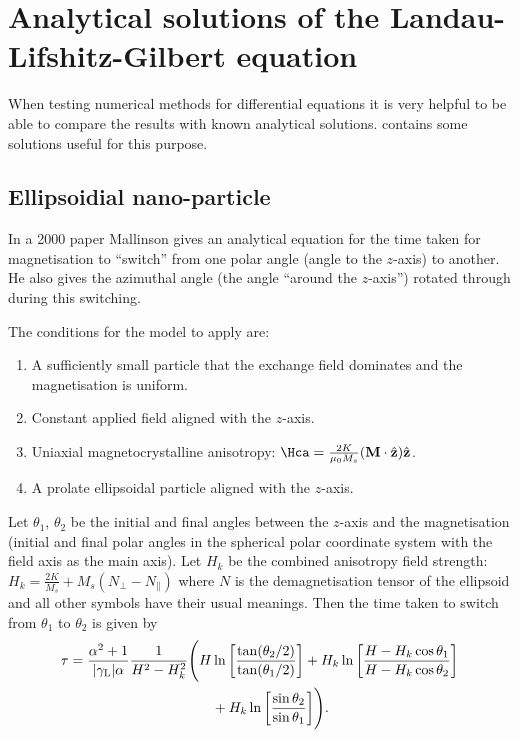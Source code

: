 \chapter{Analytical solutions of the Landau-Lifshitz-Gilbert equation}
\label{cha:analyt-solut-land}

When testing numerical methods for differential equations it is very helpful to be able to compare the results with known analytical solutions.
 contains some solutions useful for this purpose.

\section{Ellipsoidial nano-particle}
\label{sec:ellips-nano-part}

In a 2000 paper \cite{Mallinson2000} Mallinson gives an analytical equation for the time taken for magnetisation to ``switch'' from one polar angle (angle to the $z$-axis) to another.
He also gives the azimuthal angle (the angle ``around the $z$-axis'') rotated through during this switching.

The conditions for the model to apply are:
\begin{enumerate}
\item A sufficiently small particle that the exchange field dominates and the magnetisation is uniform.
\item Constant applied field aligned with the $z$-axis.
\item Uniaxial magnetocrystalline anisotropy: $\Hca = \frac{2 K}{\mu_0 M_s} \bigb{\Mv \cdot \unitz} \unitz$.
\item A prolate ellipsoidal particle aligned with the $z$-axis.
\end{enumerate}

Let $\theta_1$, $\theta_2$ be the initial and final angles between the $z$-axis and the magnetisation (\ie initial and final polar angles in the spherical polar coordinate system with the field axis as the main axis).
Let $H_k$ be the combined anisotropy field strength: $H_k = \frac{2 K}{M_s} + M_s(N_\perp - N_\parallel)$ where $N$ is the demagnetisation tensor of the ellipsoid and all other symbols have their usual meanings.
Then the time taken to switch from $\theta_1$ to $\theta_2$ is given by
\begin{equation}
  \begin{aligned}
    \tau = \frac{\alpha^2 +1}{{\left|{\gamma_{\mathrm{\tiny{L}}}} \right|} \alpha} \frac{1}{H^2 - H_k^2} \Bigg(
      H &\ln{\left[  \frac{\tan(\theta_2/2)}{\tan(\theta_1/2)}  \right]}
      + H_k \ln{\left[  \frac{H - H_k \cos\theta_1}{H - H_k \cos\theta_2}  \right]} \\
      &+ H_k \ln{\left[  \frac{\sin\theta_2}{\sin\theta_1}  \right]} \Bigg).
  \end{aligned}
\label{eq:80}
\end{equation}

